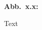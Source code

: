 
%


\begin{minipage}{16cm}
\vspace*{8cm}
\parbox{2cm}{{\bf Abb.~x.x:}}
\parbox[t]{12.5cm}
 {  Text  }
\end{minipage}
\vspace*{0.4cm}
